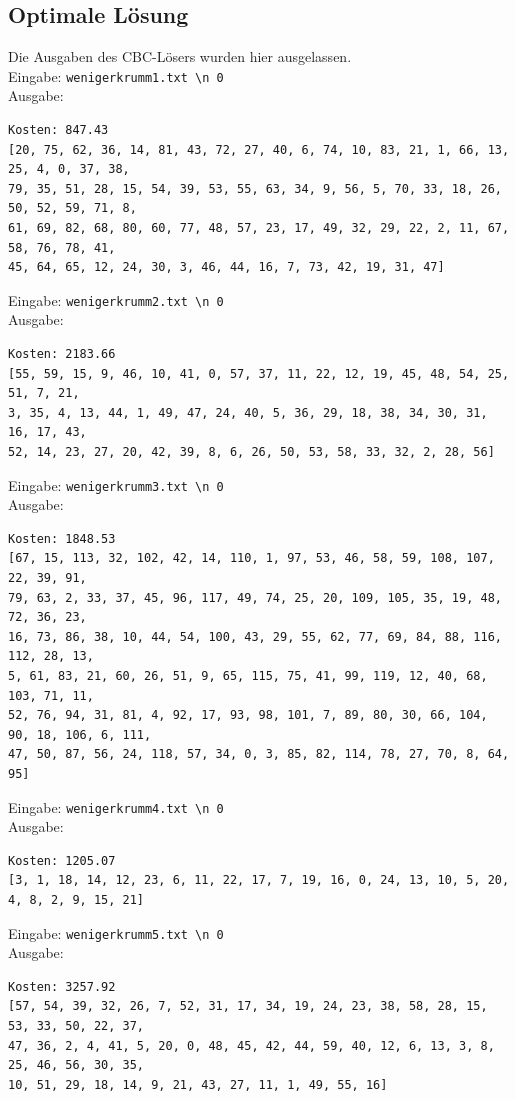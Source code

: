 \documentclass[a4paper,10pt,ngerman]{scrartcl}
\begin{document}
\subsection{Optimale Lösung}
Die Ausgaben des CBC-Lösers wurden hier ausgelassen. \\
Eingabe: \lstinline|wenigerkrumm1.txt \n 0| \\ Ausgabe:
\begin{lstlisting}
Kosten: 847.43
[20, 75, 62, 36, 14, 81, 43, 72, 27, 40, 6, 74, 10, 83, 21, 1, 66, 13, 25, 4, 0, 37, 38, 
79, 35, 51, 28, 15, 54, 39, 53, 55, 63, 34, 9, 56, 5, 70, 33, 18, 26, 50, 52, 59, 71, 8, 
61, 69, 82, 68, 80, 60, 77, 48, 57, 23, 17, 49, 32, 29, 22, 2, 11, 67, 58, 76, 78, 41, 
45, 64, 65, 12, 24, 30, 3, 46, 44, 16, 7, 73, 42, 19, 31, 47]
\end{lstlisting}
Eingabe: \lstinline|wenigerkrumm2.txt \n 0| \\ Ausgabe:
\begin{lstlisting}
Kosten: 2183.66
[55, 59, 15, 9, 46, 10, 41, 0, 57, 37, 11, 22, 12, 19, 45, 48, 54, 25, 51, 7, 21,
3, 35, 4, 13, 44, 1, 49, 47, 24, 40, 5, 36, 29, 18, 38, 34, 30, 31, 16, 17, 43,
52, 14, 23, 27, 20, 42, 39, 8, 6, 26, 50, 53, 58, 33, 32, 2, 28, 56]
\end{lstlisting}
Eingabe: \lstinline|wenigerkrumm3.txt \n 0| \\ Ausgabe:
\begin{lstlisting}
Kosten: 1848.53
[67, 15, 113, 32, 102, 42, 14, 110, 1, 97, 53, 46, 58, 59, 108, 107, 22, 39, 91, 
79, 63, 2, 33, 37, 45, 96, 117, 49, 74, 25, 20, 109, 105, 35, 19, 48, 72, 36, 23,
16, 73, 86, 38, 10, 44, 54, 100, 43, 29, 55, 62, 77, 69, 84, 88, 116, 112, 28, 13, 
5, 61, 83, 21, 60, 26, 51, 9, 65, 115, 75, 41, 99, 119, 12, 40, 68, 103, 71, 11, 
52, 76, 94, 31, 81, 4, 92, 17, 93, 98, 101, 7, 89, 80, 30, 66, 104, 90, 18, 106, 6, 111, 
47, 50, 87, 56, 24, 118, 57, 34, 0, 3, 85, 82, 114, 78, 27, 70, 8, 64, 95]
\end{lstlisting}
Eingabe: \lstinline|wenigerkrumm4.txt \n 0| \\ Ausgabe:
\begin{lstlisting}
Kosten: 1205.07
[3, 1, 18, 14, 12, 23, 6, 11, 22, 17, 7, 19, 16, 0, 24, 13, 10, 5, 20, 4, 8, 2, 9, 15, 21]
\end{lstlisting}
Eingabe: \lstinline|wenigerkrumm5.txt \n 0| \\ Ausgabe:
\begin{lstlisting}
Kosten: 3257.92
[57, 54, 39, 32, 26, 7, 52, 31, 17, 34, 19, 24, 23, 38, 58, 28, 15, 53, 33, 50, 22, 37, 
47, 36, 2, 4, 41, 5, 20, 0, 48, 45, 42, 44, 59, 40, 12, 6, 13, 3, 8, 25, 46, 56, 30, 35, 
10, 51, 29, 18, 14, 9, 21, 43, 27, 11, 1, 49, 55, 16]
\end{lstlisting}
\end{document}
